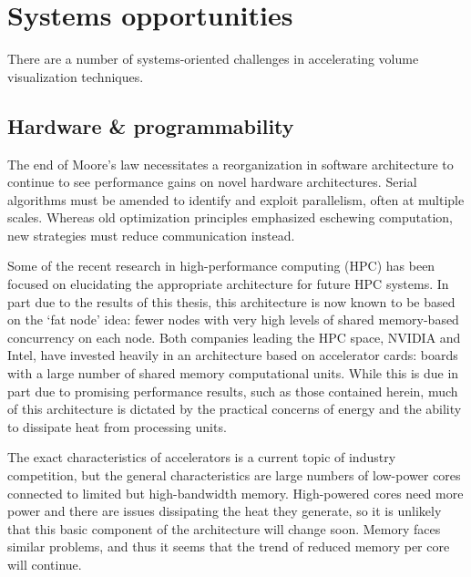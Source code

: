 \section{Systems opportunities}

There are a number of systems-oriented challenges in accelerating
volume visualization techniques.

\subsection{Hardware \& programmability}

The end of Moore's law necessitates a reorganization in software
architecture to continue to see performance gains on novel hardware
architectures.  Serial algorithms must be amended to identify
and exploit parallelism, often at multiple scales.  Whereas old
optimization principles emphasized eschewing computation, new
strategies must reduce communication instead.


Some of the recent research in high-performance computing (HPC) has
been focused on elucidating the appropriate architecture for future HPC
systems.  In part due to the results of this thesis, this architecture
is now known to be based on the `fat node' idea: fewer nodes with
very high levels of shared memory-based concurrency on each node.
Both companies leading the HPC space, NVIDIA and Intel, have invested
heavily in an architecture based on accelerator cards: boards with a
large number of shared memory computational units.  While this is due
in part due to promising performance results, such as those contained
herein, much of this architecture is dictated by the practical concerns
of energy and the ability to dissipate heat from processing units.


The exact characteristics of accelerators is a current topic of
industry competition, but the general characteristics are large numbers
of low-power cores connected to limited but high-bandwidth memory.
High-powered cores need more power and there are issues dissipating the
heat they generate, so it is unlikely that this basic component of the
architecture will change soon.  Memory faces similar problems, and thus
it seems that the trend of reduced memory per core will continue.

